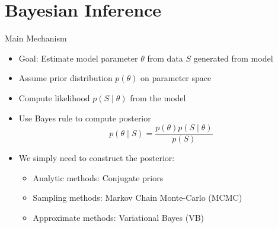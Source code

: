 \documentclass[aspectratio=169]{beamer}
\begin{document}
\section{Bayesian Inference}

\begin{frame}{Main Mechanism}
  \begin{itemize}
    \item
      Goal: Estimate model parameter $\theta$ from data $S$ generated from model
    \item
      Assume prior distribution $p(\theta)$ on parameter space
    \item
      Compute likelihood $p(S \mid \theta)$ from the model
    \item
      Use Bayes rule to compute posterior
      \begin{equation*}
        p(\theta \mid S) = \frac{p(\theta) p(S \mid \theta)}{p(S)}
      \end{equation*}
    \item
      We simply need to construct the posterior:
      \begin{itemize}
        \item
          Analytic methods: Conjugate priors
        \item
          Sampling methods: Markov Chain Monte-Carlo (MCMC)
        \item
          Approximate methods: Variational Bayes (VB)
      \end{itemize}
  \end{itemize}
\end{frame}
\end{document}
